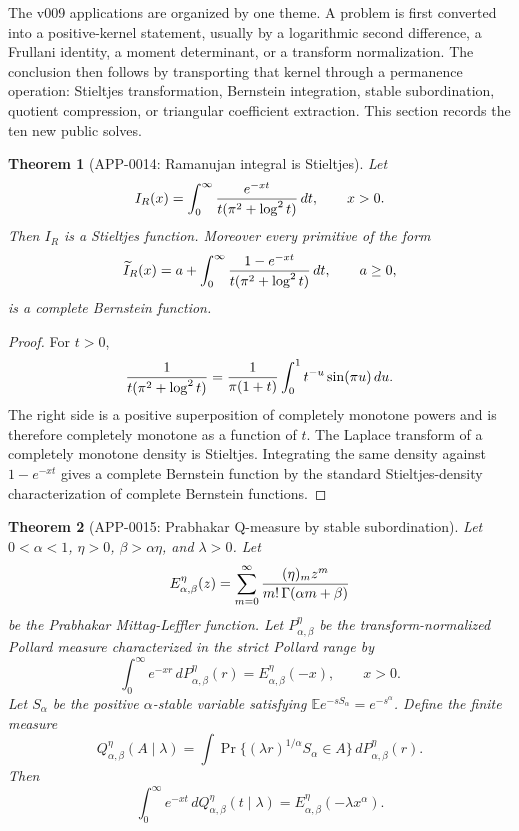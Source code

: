 \documentclass[11pt]{article}
\numberwithin{equation}{section}
\newtheorem{theorem}{Theorem}[section]
\theoremstyle{definition}
\theoremstyle{remark}
\newcommand{\1}{\mathbf 1}
\begin{document}
The v009 applications are organized by one theme.  A problem is first converted
into a positive-kernel statement, usually by a logarithmic second difference, a
Frullani identity, a moment determinant, or a transform normalization.  The
conclusion then follows by transporting that kernel through a permanence
operation: Stieltjes transformation, Bernstein integration, stable
subordination, quotient compression, or triangular coefficient extraction.  This
section records the ten new public solves.

\begin{theorem}[APP-0014: Ramanujan integral is Stieltjes]
\label{thm:app14-ramanujan-stieltjes}
Let
\[
  I_R(x)=\int_0^\infty {e^{-xt}\over t(\pi^2+\log^2 t)}\,dt,
  \qquad x>0 .
\]
Then \(I_R\) is a Stieltjes function.  Moreover every primitive of the form
\[
  \widetilde I_R(x)=a+\int_0^\infty
       {1-e^{-xt}\over t(\pi^2+\log^2 t)}\,dt,\qquad a\ge0,
\]
is a complete Bernstein function.
\end{theorem}

\begin{proof}
For \(t>0\),
\[
 {1\over t(\pi^2+\log^2t)}
   ={1\over \pi(1+t)}\int_0^1 t^{-u}\sin(\pi u)\,du .
\]
The right side is a positive superposition of completely monotone powers and is
therefore completely monotone as a function of \(t\).  The Laplace transform of
a completely monotone density is Stieltjes.  Integrating the same density
against \(1-e^{-xt}\) gives a complete Bernstein function by the standard
Stieltjes-density characterization of complete Bernstein functions.
\end{proof}

\begin{theorem}[APP-0015: Prabhakar Q-measure by stable subordination]
\label{thm:app15-prabhakar-subordination}
Let \(0<\alpha<1\), \(\eta>0\), \(\beta>\alpha\eta\), and \(\lambda>0\).
Let
\[
  E_{\alpha,\beta}^{\eta}(z)
  =\sum_{m=0}^{\infty}{(\eta)_m z^m\over m!\,\Gamma(\alpha m+\beta)}
\]
be the Prabhakar Mittag-Leffler function.  Let
\(P_{\alpha,\beta}^{\eta}\) be the transform-normalized Pollard measure
characterized in the strict Pollard range by
\[
  \int_0^\infty e^{-xr}\,dP_{\alpha,\beta}^{\eta}(r)
  =E_{\alpha,\beta}^{\eta}(-x),\qquad x>0.
\]
Let \(S_\alpha\) be the positive \(\alpha\)-stable variable satisfying
\(\mathbb E e^{-sS_\alpha}=e^{-s^\alpha}\).  Define the finite measure
\[
  Q_{\alpha,\beta}^{\eta}(A\mid\lambda)
  =\int \Pr\{(\lambda r)^{1/\alpha}S_\alpha\in A\}\,
       dP_{\alpha,\beta}^{\eta}(r).
\]
Then
\[
  \int_0^\infty e^{-xt}\,dQ_{\alpha,\beta}^{\eta}(t\mid\lambda)
  =E_{\alpha,\beta}^{\eta}(-\lambda x^\alpha).
\]
\end{theorem}
\end{document}
